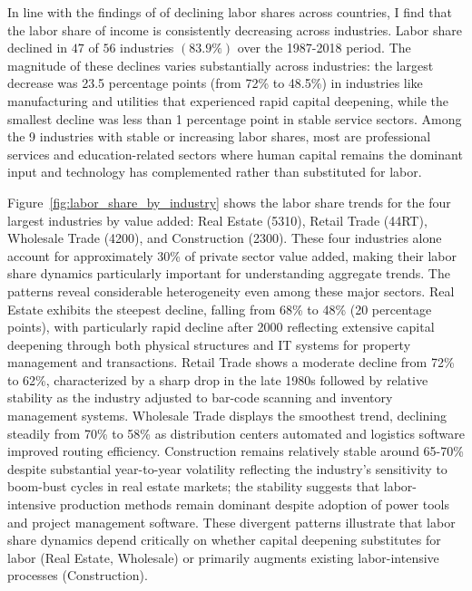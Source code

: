 \documentclass[12pt]{article}
\begin{document}
In line with the findings of \citet{karabarbounis2014global} of declining labor shares across countries, I find that the labor share of income is consistently decreasing across industries. Labor share declined in $47$ of $56$ industries $(83.9\%)$ over the 1987-2018 period. The magnitude of these declines varies substantially across industries: the largest decrease was 23.5 percentage points (from 72\% to 48.5\%) in industries like manufacturing and utilities that experienced rapid capital deepening, while the smallest decline was less than 1 percentage point in stable service sectors. Among the 9 industries with stable or increasing labor shares, most are professional services and education-related sectors where human capital remains the dominant input and technology has complemented rather than substituted for labor. 

Figure~\ref{fig:labor_share_by_industry} shows the labor share trends for the four largest industries by value added: Real Estate (5310), Retail Trade (44RT), Wholesale Trade (4200), and Construction (2300). These four industries alone account for approximately 30\% of private sector value added, making their labor share dynamics particularly important for understanding aggregate trends. The patterns reveal considerable heterogeneity even among these major sectors. Real Estate exhibits the steepest decline, falling from 68\% to 48\% (20 percentage points), with particularly rapid decline after 2000 reflecting extensive capital deepening through both physical structures and IT systems for property management and transactions. Retail Trade shows a moderate decline from 72\% to 62\%, characterized by a sharp drop in the late 1980s followed by relative stability as the industry adjusted to bar-code scanning and inventory management systems. Wholesale Trade displays the smoothest trend, declining steadily from 70\% to 58\% as distribution centers automated and logistics software improved routing efficiency. Construction remains relatively stable around 65-70\% despite substantial year-to-year volatility reflecting the industry's sensitivity to boom-bust cycles in real estate markets; the stability suggests that labor-intensive production methods remain dominant despite adoption of power tools and project management software. These divergent patterns illustrate that labor share dynamics depend critically on whether capital deepening substitutes for labor (Real Estate, Wholesale) or primarily augments existing labor-intensive processes (Construction).
\end{document}
